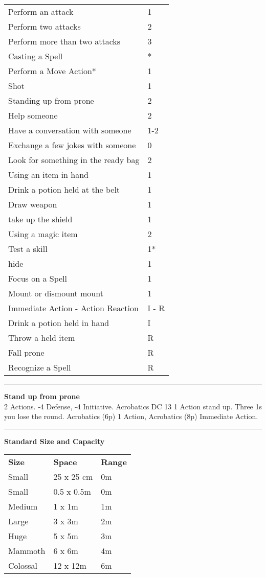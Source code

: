 \documentclass[a4paper,12 pt,openany]{book}
\newcommand{\linex}{\rule{\textwidth}{0.4pt}}
\begin{document}
\begin{textblock*}{8.3cm}
\begin{tabular}{ll}
Perform an attack & 1\\
Perform two attacks & 2\\
Perform more than two attacks & 3\\
Casting a Spell & *\\
Perform a Move Action* & 1\\
Shot & 1\\
Standing up from prone & 2\\
Help someone & 2\\
Have a conversation with someone & 1-2\\
Exchange a few jokes with someone & 0\\
Look for something in the ready bag & 2\\
Using an item in hand & 1\\
Drink a potion held at the belt & 1\\
Draw weapon & 1\\
take up the shield & 1\\
Using a magic item & 2\\
Test a skill & 1*\\
hide & 1\\
Focus on a Spell & 1\\
Mount or dismount mount & 1\\
Immediate Action - Action Reaction & I - R\\
Drink a potion held in hand & I\\
Throw a held item & R\\
Fall prone & R\\
Recognize a Spell & R\\
\end{tabular}

\linex

\textbf{Stand up from prone}\\
2 Actions. -4 Defense, -4 Initiative. Acrobatics DC 13 1 Action stand up. Three 1s you lose the round. Acrobatics (6p) 1 Action, Acrobatics (8p) Immediate Action.

\linex

\textbf{Standard Size and Capacity}\\
\begin{tabular}{lll}
\textbf{Size}& \textbf{Space} &\textbf{Range}\\
Small & 25 x 25 cm&0m\\
Small & 0.5 x 0.5m &0m\\
Medium & 1 x 1m & 1m\\
Large & 3 x 3m & 2m\\
Huge & 5 x 5m &3m\\
Mammoth & 6 x 6m&4m\\
Colossal & 12 x 12m&6m\\
\end{tabular}

\end{textblock*}
\end{document}
